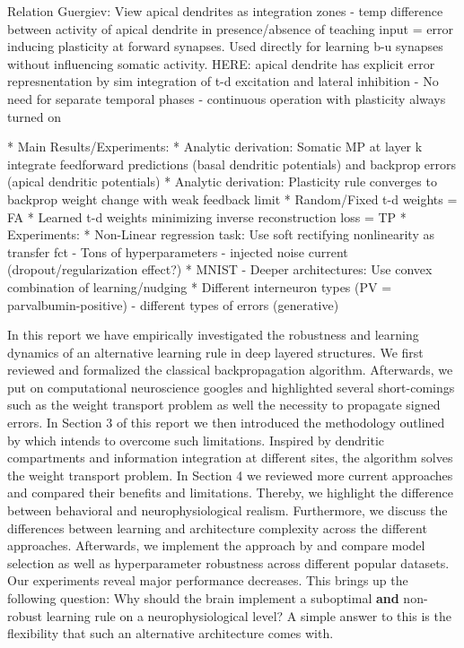\documentclass[colorinlistoftodos]{article}
\theoremstyle{definition}
\begin{document}
Relation Guergiev: View apical dendrites as integration zones - temp difference between activity of apical dendrite in presence/absence of teaching input = error inducing plasticity at forward synapses. Used directly for learning b-u synapses without influencing somatic activity. HERE: apical dendrite has explicit error represnentation by sim integration of t-d excitation and lateral inhibition - No need for separate temporal phases - continuous operation with plasticity always turned on

* Main Results/Experiments:
    * Analytic derivation: Somatic MP at layer k integrate feedforward predictions (basal dendritic potentials) and backprop errors (apical dendritic potentials)
    * Analytic derivation: Plasticity rule converges to backprop weight change with weak feedback limit
    * Random/Fixed t-d weights = FA
    * Learned t-d weights minimizing inverse reconstruction loss = TP
    * Experiments:
        * Non-Linear regression task: Use soft rectifying nonlinearity as transfer fct - Tons of hyperparameters - injected noise current (dropout/regularization effect?)
        * MNIST - Deeper architectures: Use convex combination of learning/nudging
* Different interneuron types (PV = parvalbumin-positive) - different types of errors (generative)


In this report we have empirically investigated the robustness and learning dynamics of an alternative learning rule in deep layered structures.
We first reviewed and formalized the classical backpropagation algorithm. Afterwards, we put on computational neuroscience googles and highlighted several short-comings such as the weight transport problem as well the necessity to propagate signed errors.
In Section 3 of this report we then introduced the methodology outlined by \citet{guerguiev2017} which intends to overcome such limitations. Inspired by dendritic compartments and information integration at different sites, the algorithm solves the weight transport problem.
In Section 4 we reviewed more current approaches and compared their benefits and limitations. Thereby, we highlight the difference between behavioral and neurophysiological realism. Furthermore, we discuss the differences between learning and architecture complexity across the different approaches. 
Afterwards, we implement the approach by \citet{guerguiev2017} and compare model selection as well as hyperparameter robustness across different popular datasets. Our experiments reveal major performance decreases. This brings up the following question: Why should the brain implement a suboptimal \textbf{and} non-robust learning rule on a neurophysiological level? A simple answer to this is the flexibility that such an alternative architecture comes with.
\end{document}
